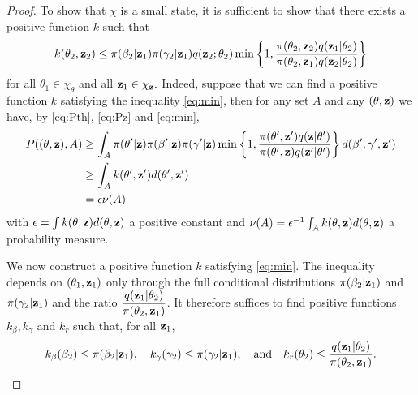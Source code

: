 \documentclass[11pt]{article}
\begin{document}
\begin{proof}
		To show that $\chi$ is a small state, it is sufficient to show that there exists a positive function $k$ such that
		\begin{equation}
		    \label{eq:min}
		    k(\theta_2, \mathbf{z}_2) \le \pi(\beta_2 | \mathbf{z}_1) \pi(\gamma_2 | \mathbf{z}_1) q(\mathbf{z}_2; \theta_2) \min\left\lbrace 1, \dfrac{\pi(\theta_2, \mathbf{z}_2)q(\mathbf{z}_1| \theta_2)}{\pi(\theta_2, \mathbf{z}_1)q(\mathbf{z}_2|\theta_2)} \right\rbrace
		\end{equation}
		for all $\theta_1 \in \chi_\theta$ and all $\mathbf{z}_1 \in \chi_{\mathbf{z}}.$
		Indeed, suppose that we can find a positive function $k$ satisfying the inequality \eqref{eq:min}, then for any set $A$ and any $(\theta, \mathbf{z})$ we have, by \eqref{eq:Pth}, \eqref{eq:Pz} and \eqref{eq:min},
		\begin{align*}
		    P((\theta, \mathbf{z}), A)
		    & \ge \int_A \pi(\theta' | \mathbf{z}) \pi(\beta' | \mathbf{z}) \pi(\gamma' | \mathbf{z}) \min\left\lbrace 1, \dfrac{\pi(\theta', \mathbf{z}')q(\mathbf{z}| \theta')}{\pi(\theta', \mathbf{z})q(\mathbf{z}'|\theta')} \right\rbrace d(\beta', \gamma', \mathbf{z}') \\
		    & \ge \int_A k(\theta', \mathbf{z}') d(\theta', \mathbf{z}') \\
		    & = \epsilon \nu(A)
		\end{align*}
		with $\epsilon = \int k(\theta, \mathbf{z}) d(\theta, \mathbf{z})$ a positive constant and $\nu(A) = \epsilon^{-1} \int_A k(\theta, \mathbf{z}) d(\theta, \mathbf{z})$ a probability measure. 
		
		We now construct a positive function $k$ satisfying \eqref{eq:min}. The inequality depends on $(\theta_1, \mathbf{z}_1)$ only through the full conditional distributions $\pi(\beta_2 | \mathbf{z}_1)$ and $\pi(\gamma_2 | \mathbf{z}_1)$ and the ratio $\dfrac{q(\mathbf{z}_1| \theta_2)}{\pi(\theta_2, \mathbf{z}_1)}$.
		It therefore suffices to find positive functions $k_\beta, k_\gamma$ and $k_r$ such that, for all $\mathbf{z}_1$,
		$$k_\beta(\beta_2) \le \pi(\beta_2 | \mathbf{z}_1),
		\quad k_\gamma(\gamma_2) \le \pi(\gamma_2 | \mathbf{z}_1),
		\quad \text{and} \quad k_r(\theta_2) \le \dfrac{q(\mathbf{z}_1|\theta_2)}{\pi(\theta_2, \mathbf{z}_1)}.$$
		

\end{proof}
\end{document}
